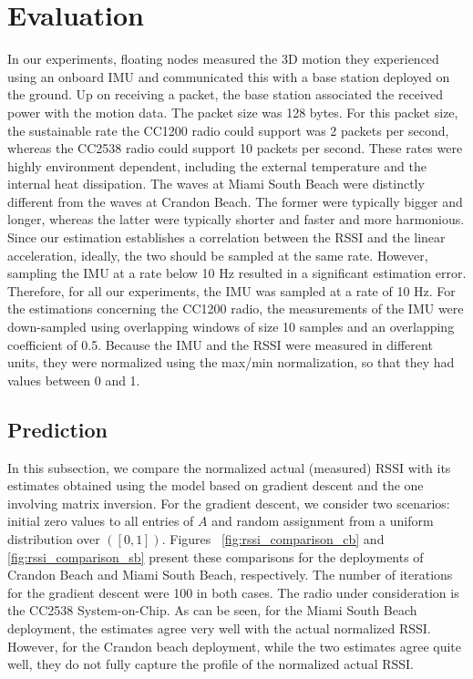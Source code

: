 \section{Evaluation}
\label{sec:evaluation}

In our experiments, floating nodes measured the 3D motion they experienced using an onboard IMU and communicated this with a base station deployed on the ground. Up on receiving a packet, the base station associated the received power with the motion data. The packet size was 128 bytes. For this packet size, the sustainable rate the CC1200 radio could support was 2 packets per second, whereas the CC2538 radio could support 10 packets per second. These rates were highly environment dependent, including the external temperature and the internal heat dissipation. The waves at Miami South Beach were distinctly different from the waves at Crandon Beach. The former were typically bigger and longer, whereas the latter were typically shorter and faster and more harmonious. Since our estimation establishes a correlation between the RSSI and the linear acceleration, ideally, the two should be sampled at the same rate. However, sampling the IMU at a rate below 10 Hz resulted in a significant estimation error. Therefore, for all our experiments, the IMU was sampled at a rate of 10 Hz. For the estimations concerning the CC1200 radio, the measurements of the IMU were down-sampled using overlapping windows of size 10 samples and an overlapping coefficient of 0.5. Because the IMU and the RSSI were measured in different units, they were normalized using the max/min normalization, so that they had values between 0 and 1. 

\subsection{Prediction}
In this subsection, we compare the normalized actual (measured) RSSI with its estimates obtained using the model based on gradient descent and the one involving matrix inversion. For the gradient descent, we consider two scenarios: initial zero values to all entries of $A$ and random assignment from a uniform distribution over $([0, 1])$. Figures ~\ref{fig:rssi_comparison_cb} and \ref{fig:rssi_comparison_sb} present these comparisons for the deployments of Crandon Beach and Miami South Beach, respectively. The number of iterations for the gradient descent were 100 in both cases. The radio under consideration is the CC2538 System-on-Chip. As can be seen, for the Miami South Beach deployment, the estimates agree very well with the actual normalized RSSI. However, for the Crandon beach deployment, while the two estimates agree quite well, they do not fully capture the profile of the normalized actual RSSI.

